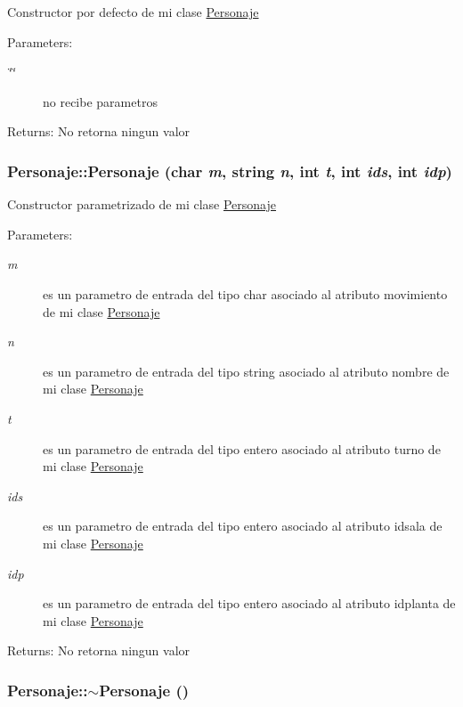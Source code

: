 Constructor por defecto de mi clase \hyperlink{classPersonaje}{Personaje} \begin{Desc}
\item[Parameters:]
\begin{description}
\item[{\em \char`\"{}\char`\"{}}]no recibe parametros \end{description}
\end{Desc}
\begin{Desc}
\item[Returns:]No retorna ningun valor \end{Desc}
\hypertarget{classPersonaje_a86eafddc218e8afa94f989b3642bcbd}{
\subsubsection[Personaje]{\setlength{\rightskip}{0pt plus 5cm}Personaje::Personaje (char {\em m}, \/  string {\em n}, \/  int {\em t}, \/  int {\em ids}, \/  int {\em idp})}}
\label{classPersonaje_a86eafddc218e8afa94f989b3642bcbd}


Constructor parametrizado de mi clase \hyperlink{classPersonaje}{Personaje} \begin{Desc}
\item[Parameters:]
\begin{description}
\item[{\em m}]es un parametro de entrada del tipo char asociado al atributo movimiento de mi clase \hyperlink{classPersonaje}{Personaje} \item[{\em n}]es un parametro de entrada del tipo string asociado al atributo nombre de mi clase \hyperlink{classPersonaje}{Personaje} \item[{\em t}]es un parametro de entrada del tipo entero asociado al atributo turno de mi clase \hyperlink{classPersonaje}{Personaje} \item[{\em ids}]es un parametro de entrada del tipo entero asociado al atributo idsala de mi clase \hyperlink{classPersonaje}{Personaje} \item[{\em idp}]es un parametro de entrada del tipo entero asociado al atributo idplanta de mi clase \hyperlink{classPersonaje}{Personaje} \end{description}
\end{Desc}
\begin{Desc}
\item[Returns:]No retorna ningun valor \end{Desc}
\hypertarget{classPersonaje_0b3c25862a6081aaee96e77c08edda29}{
\subsubsection[$\sim$Personaje]{\setlength{\rightskip}{0pt plus 5cm}Personaje::$\sim$Personaje ()}}
\label{classPersonaje_0b3c25862a6081aaee96e77c08edda29}


